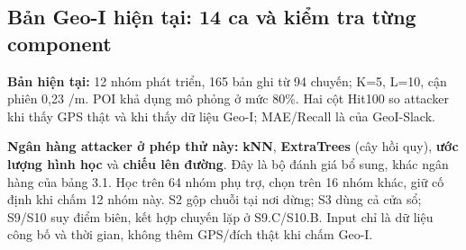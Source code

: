 \documentclass[10pt,a4paper]{article}
\begin{document}
\clearpage
\subsection{Bản Geo-I hiện tại: 14 ca và kiểm tra từng component}\label{sub:3.2}
\textbf{Bản hiện tại:} 12 nhóm phát triển, 165 bản ghi từ 94 chuyến; K=5, L=10, cận phiên 0,23 /m. POI khả dụng mô phỏng ở mức 80\%. Hai cột Hit100 so attacker khi thấy GPS thật và khi thấy dữ liệu Geo-I; MAE/Recall là của GeoI-Slack.

\textbf{Ngân hàng attacker ở phép thử này:} \textbf{kNN}, \textbf{ExtraTrees} (cây hồi quy), \textbf{ước lượng hình học} và \textbf{chiếu lên đường}. Đây là bộ đánh giá bổ sung, khác ngân hàng của bảng 3.1. Học trên 64 nhóm phụ trợ, chọn trên 16 nhóm khác, giữ cố định khi chấm 12 nhóm này. S2 gộp chuỗi tại nơi dừng; S3 dùng cả cửa sổ; S9/S10 suy điểm biên, kết hợp chuyến lặp ở S9.C/S10.B. Input chỉ là dữ liệu công bố và thời gian, không thêm GPS/đích thật khi chấm Geo-I.
\end{document}
